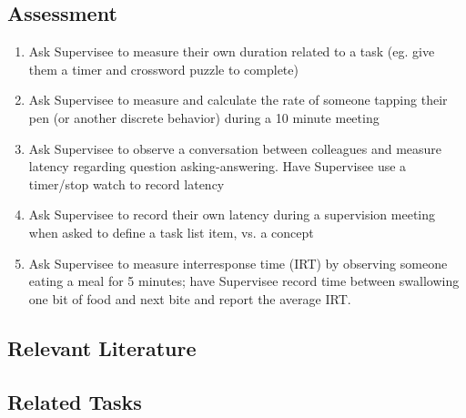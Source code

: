 \subsection{Assessment}
\begin{enumerate}
\item Ask Supervisee to measure their own duration related to a task (eg. give them a timer and crossword puzzle to complete)
\item Ask Supervisee to measure and calculate the rate of someone tapping their pen (or another discrete behavior) during a 10 minute meeting
\item Ask Supervisee to observe a conversation between colleagues and measure latency regarding question asking-answering.  Have Supervisee use a timer/stop watch to record latency
\item Ask Supervisee to record their own latency during a supervision meeting when asked to define a task list item, vs. a concept 
\item Ask Supervisee to measure interresponse time (IRT) by observing someone eating a meal for 5 minutes; have Supervisee record time between swallowing one bit of food and next bite and report the average IRT.
%
\end{enumerate}
%
\subsection{Relevant Literature}
\begin{refsection}
\nocite{cooper2007applied,
        johnston2010strategies,
        thomason2011response,
        worsdell2002duration}
\printbibliography[heading=none]
\end{refsection}
%
\subsection{Related Tasks}
\fouraOne{}\\
\fouraTwo{}\\
\fouraThree{}\\
\fouraFour{}\\
\fouraFive{}\\
\fouraNine{}\\
\fourdTwentyOne{}\\
%
\clearpage \section[\fourhFive{}]{\fourhFive{}%
              }
